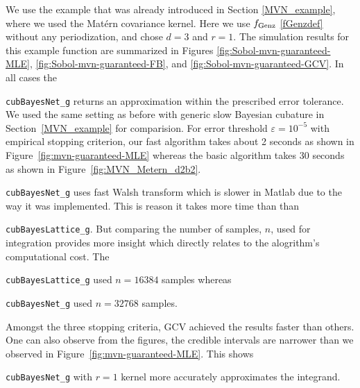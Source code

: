 \documentclass{iitthesis}          %
\newcommand{\code}[1]{\texttt{#1}}
\newcommand\figref{Figure~\ref}
\newcommand\secref{Section~\ref}
\begin{document}
We use the example that was already introduced in Section \ref{MVN_example}, where we used the Mat\'ern covariance kernel.  Here we use $ f_{\textup{Genz}}$ \eqref{fGenzdef} without any periodization, and chose $d=3$ and $r=1$. The simulation results for this example function are summarized in Figures \ref{fig:Sobol-mvn-guaranteed-MLE}, \ref{fig:Sobol-mvn-guaranteed-FB}, and \ref{fig:Sobol-mvn-guaranteed-GCV}.  In all cases the {\code{cubBayesNet\_g} returns an approximation within the prescribed error tolerance. We used the same setting as before with generic slow Bayesian cubature in \secref{MVN_example} for comparision. For error threshold $\varepsilon=10^{-5}$ with empirical stopping criterion, our fast algorithm takes about 2 seconds as shown in \figref{fig:mvn-guaranteed-MLE} whereas the basic algorithm takes 30 seconds as shown in \figref{fig:MVN_Metern_d2b2}. 
{\code{cubBayesNet\_g} uses fast Walsh transform which is slower in Matlab due to the way it was implemented. This is reason it takes more time than than {\code{cubBayesLattice\_g}. 
But comparing the number of samples, $n$, used for integration provides more insight which directly relates to the alogrithm's computational cost. The {\code{cubBayesLattice\_g} used $n=16384$ samples whereas {\code{cubBayesNet\_g} used $n=32768$ samples.

Amongst the three stopping criteria, GCV achieved the results faster than others. 
One can also observe from the figures, the credible intervals are narrower than we observed in \figref{fig:mvn-guaranteed-MLE}.
This shows {\code{cubBayesNet\_g} with $r=1$ kernel more accurately approximates the integrand.

}}}}}}
\end{document}
